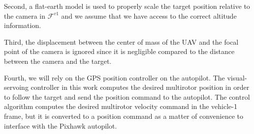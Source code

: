 Second, a flat-earth model is used to properly scale the target position relative to the camera in $\mathcal{F}^{v1}$ and we assume that we have access to the correct altitude information. 

Third, the displacement between the center of mass of the UAV and the focal point of the camera is ignored since it is negligible compared to the distance between the camera and the target. 

Fourth, we will rely on the GPS position controller on the autopilot. The visual-servoing controller in this work computes the desired multirotor position in order to follow the target and send the position command to the autopilot. The control algorithm computes the desired multirotor velocity command in the vehicle-1 frame, but it is converted to a position command as a matter of convenience to interface with the Pixhawk autopilot.

